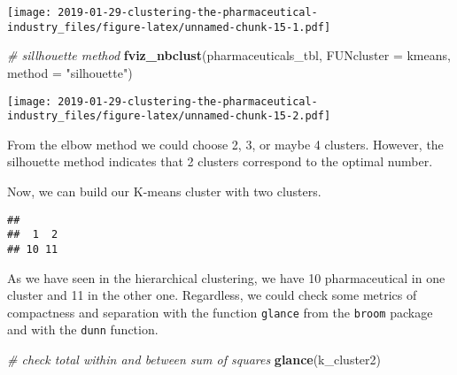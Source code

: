 \documentclass[]{article}
\newenvironment{Shaded}{\begin{snugshade}}{\end{snugshade}}
\newcommand{\KeywordTok}[1]{\textcolor[rgb]{0.13,0.29,0.53}{\textbf{#1}}}
\newcommand{\DataTypeTok}[1]{\textcolor[rgb]{0.13,0.29,0.53}{#1}}
\newcommand{\DecValTok}[1]{\textcolor[rgb]{0.00,0.00,0.81}{#1}}
\newcommand{\StringTok}[1]{\textcolor[rgb]{0.31,0.60,0.02}{#1}}
\newcommand{\CommentTok}[1]{\textcolor[rgb]{0.56,0.35,0.01}{\textit{#1}}}
\newcommand{\OperatorTok}[1]{\textcolor[rgb]{0.81,0.36,0.00}{\textbf{#1}}}
\newcommand{\NormalTok}[1]{#1}
\begin{document}
\texttt{[image: 2019-01-29-clustering-the-pharmaceutical-industry\_files/figure-latex/unnamed-chunk-15-1.pdf]}

\begin{Shaded}
\begin{Highlighting}[]
\CommentTok{# sillhouette method}
\KeywordTok{fviz_nbclust}\NormalTok{(pharmaceuticals_tbl, }\DataTypeTok{FUNcluster =}\NormalTok{ kmeans, }\DataTypeTok{method =} \StringTok{"silhouette"}\NormalTok{)}
\end{Highlighting}
\end{Shaded}

\texttt{[image: 2019-01-29-clustering-the-pharmaceutical-industry\_files/figure-latex/unnamed-chunk-15-2.pdf]}

From the elbow method we could choose 2, 3, or maybe 4 clusters.
However, the silhouette method indicates that 2 clusters correspond to
the optimal number.

Now, we can build our K-means cluster with two clusters.

\begin{Shaded}
\end{Shaded}

\begin{verbatim}
## 
##  1  2 
## 10 11
\end{verbatim}

As we have seen in the hierarchical clustering, we have 10
pharmaceutical in one cluster and 11 in the other one. Regardless, we
could check some metrics of compactness and separation with the function
\texttt{glance} from the \texttt{broom} package and with the
\texttt{dunn} function.

\begin{Shaded}
\begin{Highlighting}[]
\CommentTok{# check total within and between sum of squares}
\KeywordTok{glance}\NormalTok{(k_cluster2)}
\end{Highlighting}
\end{Shaded}
\end{document}
